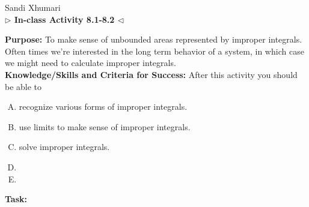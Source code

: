 \documentclass[answers]{exam}
\begin{document}
	\begin{center}
	\hfill Sandi Xhumari \\ \textbf{$\triangleright$ In-class Activity 8.1-8.2 $\triangleleft$}\\
\end{center}

\textbf{Purpose:} To make sense of unbounded areas represented by improper integrals. Often times we're interested in the long term behavior of a system, in which case we might need to calculate improper integrals. \\

\textbf{Knowledge/Skills and Criteria for Success:} After this activity you should be able to

\begin{enumerate}[A.]
	\item recognize various forms of improper integrals. 
	\item use limits to make sense of improper integrals.
	\item solve improper integrals.
	\item
	\item
	
\end{enumerate}

\textbf{Task:}
\end{document}
